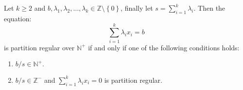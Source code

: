 \begin{proposition}\label{prop:rado_non_homo}
	Let $k \geq 2$ and $b, \lambda_1, \lambda_2, \ldots, \lambda_{k} \in \mathbb{Z} \setminus \left\{0\right\}$, finally let $s = \sum_{i = 1}^k \lambda_{i}$. Then the equation:
	\begin{equation}\label{eq:non_homo}
		\sum_{i = 1}^k \lambda_i x_i = b
	\end{equation}
	is partition regular over $\mathbb{N}^{+}$ if and only if one of the following conditions holds:
	\begin{enumerate}[label=(NH\arabic*), leftmargin=*]
		\item $b/s \in \mathbb{N}^{+}$. \label{NH1}
		\item $b/s \in \mathbb{Z}^{-}$ and $\sum_{i = 1}^k \lambda_{i} x_{i} = 0$ is partition regular. \label{NH2}
	\end{enumerate}
\end{proposition}
